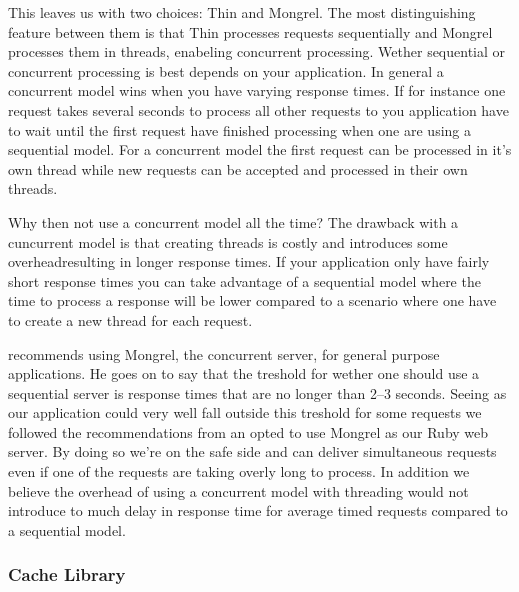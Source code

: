 This leaves us with two choices: Thin and Mongrel. The most distinguishing
feature between them is that Thin processes requests sequentially and Mongrel
processes them in threads, enabeling concurrent processing. Wether
sequential or concurrent processing is best depends on your application.
In general a concurrent model wins when you have varying response times.
If for instance one request takes several seconds to process all other
requests to you application have to wait until the first request have
finished processing when one are using a sequential model. For a concurrent
model the first request can be processed in it's own thread while new requests
can be accepted and processed in their own threads.

Why then not use a concurrent model all the time? The drawback with a
cuncurrent model is that creating threads is costly and introduces some
overhead\dash{}resulting in longer response times. If your application
only have fairly short response times you can take advantage of a
sequential model where the time to process a response will be lower compared
to a scenario where one have to create a new thread for each request.

\citet{zygmuntowicz08} recommends using Mongrel, the concurrent server,
for general purpose applications. He goes on to say that the treshold
for wether one should use a sequential server is response times that
are no longer than 2--3 seconds. Seeing as our application could very
well fall outside this treshold for some requests%
we followed the recommendations from \citeauthor{zygmuntowicz08} an opted
to use Mongrel as our Ruby web server. By doing so we're on the safe side
and can deliver simultaneous requests even if one of the requests are taking
overly long to process. In addition we believe the overhead of using a
concurrent model with threading would not introduce to much delay in
response time for average timed requests compared to a sequential model.

\subsubsection{Cache Library}
\label{section:selection.stack.server.cache}


